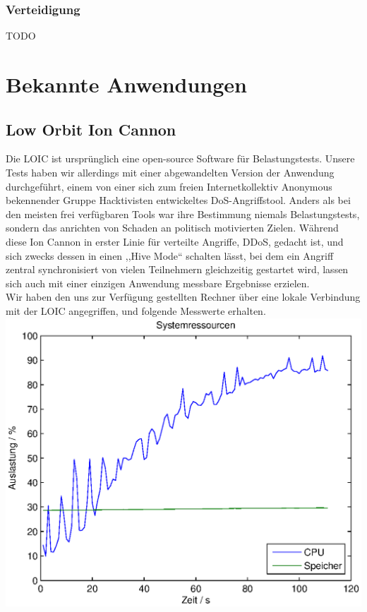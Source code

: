\documentclass[12pt,a4paper]{article}
\begin{document}
\subsubsection*{Verteidigung}
TODO
\section{Bekannte Anwendungen}
\subsection{Low Orbit Ion Cannon}
Die LOIC ist ursprünglich eine open-source Software für Belastungstests. Unsere Tests haben wir allerdings mit einer abgewandelten Version der Anwendung durchgeführt, einem von einer sich zum freien Internetkollektiv Anonymous bekennender Gruppe Hacktivisten entwickeltes DoS-Angriffstool. Anders als bei den meisten frei verfügbaren Tools war ihre Bestimmung niemals Belastungstests, sondern das anrichten von Schaden an politisch motivierten Zielen. Während diese Ion Cannon in erster Linie für verteilte Angriffe, DDoS, gedacht ist, und sich zwecks dessen in einen ,,Hive Mode`` schalten lässt, bei dem ein Angriff zentral synchronisiert von vielen Teilnehmern gleichzeitig gestartet wird, lassen sich auch mit einer einzigen Anwendung messbare Ergebnisse erzielen.\\
Wir haben den uns zur Verfügung gestellten Rechner über eine lokale Verbindung mit der LOIC angegriffen, und folgende Messwerte erhalten.\\
\includegraphics[scale=0.9]{MatLab/LOICVictimSys.eps}\\
\end{document}
